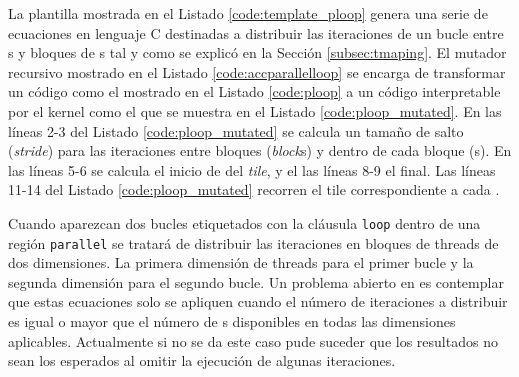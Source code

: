 La plantilla mostrada en el Listado \ref{code:template_ploop} genera una serie de 
ecuaciones en lenguaje C destinadas a distribuir las iteraciones de un bucle entre 
\thread{}s y bloques de \thread{}s tal y como se explicó en la Sección 
\ref{subsec:tmaping}. El mutador recursivo mostrado en el Listado 
\ref{code:accparallelloop} se encarga de transformar un código como el mostrado en
el Listado \ref{code:ploop} a un código interpretable por el kernel como el que se
muestra en el Listado \ref{code:ploop_mutated}.
En las líneas 2-3 del Listado \ref{code:ploop_mutated} se calcula un tamaño de salto 
(\textit{stride}) para las iteraciones entre bloques (\textit{block}s) y dentro de cada 
bloque (\thread{}s). En las líneas 5-6 se calcula el inicio de del \textit{tile}, y el
las líneas 8-9 el final. Las líneas 11-14 del Listado \ref{code:ploop_mutated} recorren el 
tile correspondiente a cada \thread{}.

Cuando aparezcan dos bucles etiquetados con la cláusula \texttt{loop} dentro de una región
\texttt{parallel} se tratará de distribuir las iteraciones en bloques de threads de dos 
dimensiones. La primera dimensión de threads para el primer bucle y la segunda dimensión
para el segundo bucle. Un problema abierto en \accULL{} es contemplar que estas ecuaciones
solo se apliquen cuando el número de iteraciones a distribuir es igual o mayor que el 
número de \thread{}s disponibles en todas las dimensiones aplicables. Actualmente si no 
se da este caso pude suceder que los resultados no sean los esperados al omitir la 
ejecución de algunas iteraciones.
